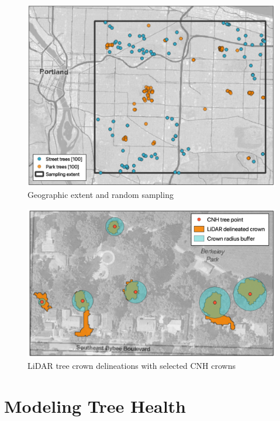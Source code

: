 \documentclass[12pt,twoside]{reedthesis}
\begin{document}
\begin{figure}[H]

{\centering \includegraphics[width=0.8\linewidth,]{figure/extent_and_samples} 

}

\caption{Geographic extent and random sampling}\label{fig:clip-extent}
\end{figure}
\begin{figure}[H]

{\centering \includegraphics[width=0.8\linewidth,]{figure/layered_outputs} 

}

\caption{LiDAR tree crown delineations with selected CNH crowns}\label{fig:unnamed-chunk-5}
\end{figure}
\hypertarget{modeling-tree-health}{%
\section{Modeling Tree Health}\label{modeling-tree-health}}
\end{document}
